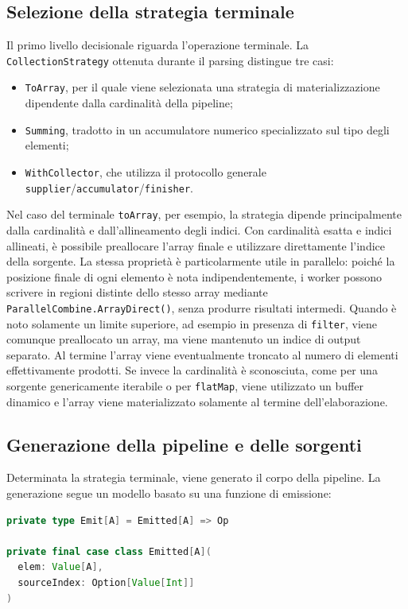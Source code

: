 \documentclass[a4paper,11pt]{report}
\theoremstyle{definition}
\begin{document}
\subsection{Selezione della strategia terminale}

Il primo livello decisionale riguarda l'operazione terminale. La \texttt{CollectionStrategy} ottenuta durante il parsing distingue tre casi:

\begin{itemize}
  \item \texttt{ToArray}, per il quale viene selezionata una strategia di materializzazione dipendente dalla cardinalità della pipeline;
  \item \texttt{Summing}, tradotto in un accumulatore numerico specializzato sul tipo degli elementi;
  \item \texttt{WithCollector}, che utilizza il protocollo generale \texttt{supplier}/\texttt{accumulator}/\texttt{finisher}.
\end{itemize}

Nel caso del terminale \texttt{toArray}, per esempio, la strategia dipende principalmente dalla cardinalità e dall'allineamento degli indici. Con cardinalità esatta e indici allineati, è possibile preallocare l'array finale e utilizzare direttamente l'indice della sorgente. La stessa proprietà è particolarmente utile in parallelo: poiché la posizione finale di ogni elemento è nota indipendentemente, i worker possono scrivere in regioni distinte dello stesso array mediante \texttt{ParallelCombine.ArrayDirect()}, senza produrre risultati intermedi. Quando è noto solamente un limite superiore, ad esempio in presenza di \texttt{filter}, viene comunque preallocato un array, ma viene mantenuto un indice di output separato. Al termine l'array viene eventualmente troncato al numero di elementi effettivamente prodotti. Se invece la cardinalità è sconosciuta, come per una sorgente genericamente iterabile o per \texttt{flatMap}, viene utilizzato un buffer dinamico e l'array viene materializzato solamente al termine dell'elaborazione.

\subsection{Generazione della pipeline e delle sorgenti}

Determinata la strategia terminale, viene generato il corpo della pipeline. La generazione segue un modello basato su una funzione di emissione:

\begin{lstlisting}[language=Scala]
private type Emit[A] = Emitted[A] => Op

private final case class Emitted[A](
  elem: Value[A],
  sourceIndex: Option[Value[Int]]
)
\end{lstlisting}
\end{document}
